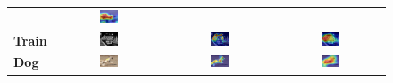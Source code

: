\begin{figure}[H]
\begin{tcolorbox}[colframe=black!60, colback=white, boxrule=0.8pt, arc=2pt, left=2pt, right=2pt, top=2pt, bottom=2pt]
\begin{tabular}{m{2.5cm} c c c}
    & \includegraphics[width=0.18\textwidth,height=0.18\textwidth]{figures/test_cams/ours/2007_000033_0}
    \\
    \textbf{Train}
    & \includegraphics[width=0.18\textwidth,height=0.18\textwidth]{figures/originals/2007_000123}
    & \includegraphics[width=0.18\textwidth,height=0.18\textwidth]{figures/test_cams/weclip/2007_000123_18}
    & \includegraphics[width=0.18\textwidth,height=0.18\textwidth]{figures/test_cams/ours/2007_000123_18}
    \\
    \textbf{Dog}
    & \includegraphics[width=0.18\textwidth,height=0.18\textwidth]{figures/originals/2007_003194}
    & \includegraphics[width=0.18\textwidth,height=0.18\textwidth]{figures/test_cams/weclip/2007_003194_11}
    & \includegraphics[width=0.18\textwidth,height=0.18\textwidth]{figures/test_cams/ours/2007_003194_11}

\end{tabular}
\end{tcolorbox}
\end{figure}
